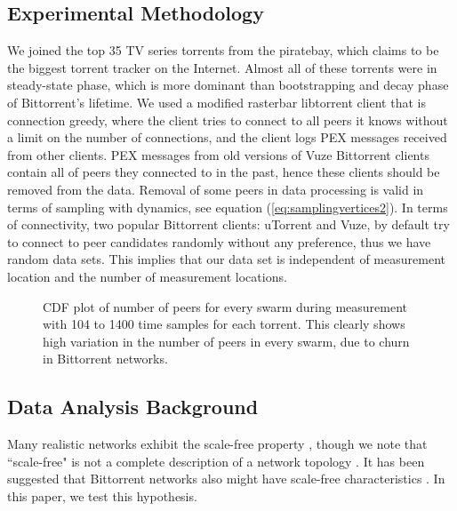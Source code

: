 \documentclass[paper]{ieice}
\begin{document}
\subsection{Experimental Methodology}
We joined the top 35 TV series torrents from the piratebay, which claims to be the biggest torrent tracker on the Internet.
Almost all of these torrents were in steady-state phase, which is more dominant than bootstrapping and decay phase of Bittorrent's lifetime.
We used a modified rasterbar libtorrent \cite{rasterbar} client that is connection greedy, where the client tries to connect to all peers it knows without a limit on the number of connections, and the client logs PEX messages received from other clients.
PEX messages from old versions of Vuze Bittorrent clients contain all of peers they connected to in the past, hence these clients should be removed from the data.
Removal of some peers in data processing is valid in terms of sampling with dynamics, see equation (\ref{eq:samplingvertices2}).
In terms of connectivity, two popular Bittorrent clients: uTorrent and Vuze, by default try to connect to peer candidates randomly without any preference, thus we have random data sets.
This implies that our data set is independent of measurement location and the number of measurement locations.

\begin{figure}
\centering
{}
\caption{CDF plot of number of peers for every swarm during measurement with 104 to 1400 time samples for each torrent. This clearly shows high variation in the number of peers in every swarm, due to churn in Bittorrent networks.} 
\label{fig:num_peers}
\vspace{-2mm}
\end{figure}

\subsection{Data Analysis Background}
Many realistic networks exhibit the scale-free property \cite{clauset2009power}, though we note that ``scale-free" is not a complete description of a network topology \cite{doyle2005robust}\cite{mahadevan2006systematic}. 
It has been suggested that Bittorrent networks also might have scale-free characteristics \cite{dale2008evolution}. 
In this paper, we test this hypothesis. 
\end{document}
